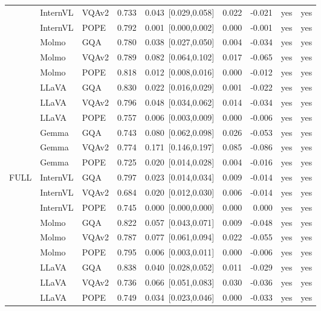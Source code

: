 \begin{longtable}{@{}lll rrrr cc@{}}
 & InternVL & VQAv2 & 0.733 & 0.043~{\scriptsize[0.029,0.058]} & 0.022 & -0.021 & yes & yes \\
 & InternVL & POPE & 0.792 & 0.001~{\scriptsize[0.000,0.002]} & 0.000 & -0.001 & yes & yes \\
 & Molmo & GQA & 0.780 & 0.038~{\scriptsize[0.027,0.050]} & 0.004 & -0.034 & yes & yes \\
 & Molmo & VQAv2 & 0.789 & 0.082~{\scriptsize[0.064,0.102]} & 0.017 & -0.065 & yes & yes \\
 & Molmo & POPE & 0.818 & 0.012~{\scriptsize[0.008,0.016]} & 0.000 & -0.012 & yes & yes \\
 & LLaVA & GQA & 0.830 & 0.022~{\scriptsize[0.016,0.029]} & 0.001 & -0.022 & yes & yes \\
 & LLaVA & VQAv2 & 0.796 & 0.048~{\scriptsize[0.034,0.062]} & 0.014 & -0.034 & yes & yes \\
 & LLaVA & POPE & 0.757 & 0.006~{\scriptsize[0.003,0.009]} & 0.000 & -0.006 & yes & yes \\
 & Gemma & GQA & 0.743 & 0.080~{\scriptsize[0.062,0.098]} & 0.026 & -0.053 & yes & yes \\
 & Gemma & VQAv2 & 0.774 & 0.171~{\scriptsize[0.146,0.197]} & 0.085 & -0.086 & yes & yes \\
 & Gemma & POPE & 0.725 & 0.020~{\scriptsize[0.014,0.028]} & 0.004 & -0.016 & yes & yes \\
\midrule
FULL & InternVL & GQA & 0.797 & 0.023~{\scriptsize[0.014,0.034]} & 0.009 & -0.014 & yes & yes \\
 & InternVL & VQAv2 & 0.684 & 0.020~{\scriptsize[0.012,0.030]} & 0.006 & -0.014 & yes & yes \\
 & InternVL & POPE & 0.745 & 0.000~{\scriptsize[0.000,0.000]} & 0.000 & 0.000 & yes & yes \\
 & Molmo & GQA & 0.822 & 0.057~{\scriptsize[0.043,0.071]} & 0.009 & -0.048 & yes & yes \\
 & Molmo & VQAv2 & 0.787 & 0.077~{\scriptsize[0.061,0.094]} & 0.022 & -0.055 & yes & yes \\
 & Molmo & POPE & 0.795 & 0.006~{\scriptsize[0.003,0.011]} & 0.000 & -0.006 & yes & yes \\
 & LLaVA & GQA & 0.838 & 0.040~{\scriptsize[0.028,0.052]} & 0.011 & -0.029 & yes & yes \\
 & LLaVA & VQAv2 & 0.736 & 0.066~{\scriptsize[0.051,0.083]} & 0.030 & -0.036 & yes & yes \\
 & LLaVA & POPE & 0.749 & 0.034~{\scriptsize[0.023,0.046]} & 0.000 & -0.033 & yes & yes \\

\end{longtable}

